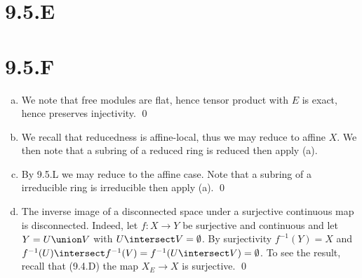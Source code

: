 \documentclass{article}
\begin{document}
\section{9.5.E}

\section{9.5.F}
\begin{enumerate}[a.]
    \item We note that free modules are flat, hence tensor product with
          $E$ is exact, hence preserves injectivity. \qed
    \item We recall that reducedness is affine-local, thus we may reduce to affine
          $X$. We then note that a subring of a reduced ring is
          reduced then apply (a).
    \item By 9.5.L we may reduce to the affine case. Note that a subring of a irreducible
          ring is irreducible then apply (a). \qed
    \item The inverse image of a disconnected space under a surjective continuous map is
          disconnected. Indeed, let $f: X \to Y$ be surjective and continuous
          and let $Y=U \union V$ with $U \intersect V = \emptyset$. By surjectivity
          $f^{-1}(Y)=X$ and $f^{-1}(U) \intersect
              f^{-1}(V)=f^{-1}(U \intersect V) = \emptyset$. To see the result, recall
          that (9.4.D) the map $X_E \to X$ is surjective. \qed
\end{enumerate}
\end{document}

